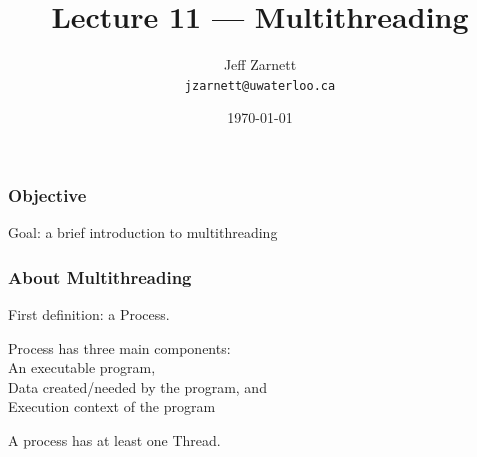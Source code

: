
\usepackage{alltt}

\title{Lecture 11 --- Multithreading}

\author{Jeff Zarnett\\ \small \texttt{jzarnett@uwaterloo.ca}}
\date{\today}





\begin{frame}
  \titlepage

\end{frame}

\begin{frame}
\frametitle{Objective}

\begin{changemargin}{1cm}
Goal: a brief introduction to multithreading
\end{changemargin}
\end{frame}

\begin{frame}
\frametitle{About Multithreading}
\begin{changemargin}{1cm}
First definition: a \alert{Process}.

Process has three main components:\\
\quad An executable program,\\
\quad Data created/needed by the program, and\\
\quad Execution context of the program 

A process has at least one \alert{Thread}.

\end{changemargin}
\end{frame}

